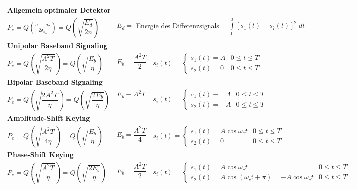 \renewcommand{\arraystretch}{2}
	\begin{tabular}{ p{6cm} p{2.5cm} p{9cm} }
		
		\multicolumn{3}{l}{\textbf{Allgemein optimaler Detektor}} \\
		$P_e= Q\left(\frac{a_1 - a_2}{2\sigma_{n_o}}\right)  = Q\left(\sqrt{\dfrac{E_d}{2n}}\right)$
		& \multicolumn{2}{l}{$E_d =$ Energie des Differenzsignals = $\int\limits_{0}^{T}[s_1(t) - s_2(t)]^2 \; dt$}
		\\
					
		\multicolumn{3}{l}{\textbf{Unipolar Baseband Signaling}} \\
		$ P_e = Q\left(\sqrt{\dfrac{A^2 T}{2 \eta}}\right) = Q\left(\sqrt{\dfrac{E_b}{\eta}}\right) $
		& $ E_b = \dfrac{A^2 T}{2} $
		& $ s_i(t) = \begin{cases}
		     s_1(t) = A & 0 \leq t \leq T \\       
		     s_2(t) = 0 & 0 \leq t \leq T
		   \end{cases}$ \\  

		\multicolumn{3}{l}{\textbf{Bipolar Baseband Signaling}} \\
		$ P_e = Q\left(\sqrt{\dfrac{2 A^2 T}{\eta}}\right) = Q\left(\sqrt{\dfrac{2 E_b}{\eta}}\right) $
		& $ E_b = A^2 T $
		& $ s_i(t) = \begin{cases}
 		     s_1(t) = +A & 0 \leq t \leq T \\       
 		     s_2(t) = -A & 0 \leq t \leq T
 		   \end{cases} $ \\

		\multicolumn{3}{l}{\textbf{Amplitude-Shift Keying}} \\
		$ P_e = Q\left(\sqrt{\dfrac{A^2 T}{4 \eta}}\right) = Q\left(\sqrt{\dfrac{E_b}{\eta}}\right) $
		& $ E_b = \dfrac{A^2 T}{4} $
		& $ s_i(t) = \begin{cases}
 		     s_1(t) = A \cos{\omega_c t} & 0 \leq t \leq T \\       
 		     s_2(t) = 0 & 0 \leq t \leq T
 		   \end{cases} $ \\

		\multicolumn{3}{l}{\textbf{Phase-Shift Keying}} \\
		$ P_e = Q\left(\sqrt{\dfrac{A^2 T}{\eta}}\right) = Q\left(\sqrt{\dfrac{2 E_b}{\eta}}\right)  $
		& $ E_b = \dfrac{A^2 T}{2} $
		& $ s_i(t) = \begin{cases}
 		     s_1(t) = A \cos{\omega_c t} & 0 \leq t \leq T \\       
 		     s_2(t) = A \cos{(\omega_c t + \pi)} = - A \cos{\omega_c t} & 0 \leq t \leq T
 		   \end{cases} $ \\


\end{tabular}
